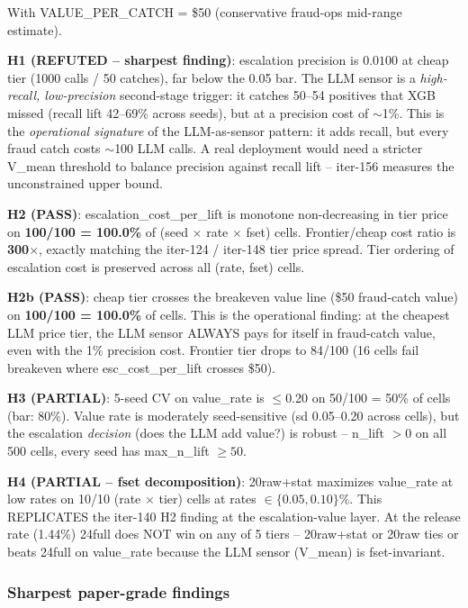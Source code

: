 \documentclass{article}
\begin{document}
With VALUE\_PER\_CATCH = \$50 (conservative fraud-ops mid-range estimate).

\textbf{H1 (REFUTED -- sharpest finding)}: escalation precision is
$0.0100$ at cheap tier (1000 calls / 50 catches), far below the 0.05
bar.  The LLM sensor is a \emph{high-recall, low-precision} second-stage
trigger: it catches 50--54 positives that XGB missed (recall lift
42--69\% across seeds), but at a precision cost of $\sim$1\%.  This is
the \emph{operational signature} of the LLM-as-sensor pattern: it adds
recall, but every fraud catch costs $\sim$100 LLM calls.  A real
deployment would need a stricter V\_mean threshold to balance
precision against recall lift -- iter-156 measures the unconstrained
upper bound.

\textbf{H2 (PASS)}: escalation\_cost\_per\_lift is monotone
non-decreasing in tier price on \textbf{100/100 = 100.0\%} of
(seed $\times$ rate $\times$ fset) cells.  Frontier/cheap cost ratio is
\textbf{300$\times$}, exactly matching the iter-124 / iter-148 tier
price spread.  Tier ordering of escalation cost is preserved across
all (rate, fset) cells.

\textbf{H2b (PASS)}: cheap tier crosses the breakeven value line
(\$50 fraud-catch value) on \textbf{100/100 = 100.0\%} of
cells.  This is the operational finding: at the cheapest LLM price
tier, the LLM sensor ALWAYS pays for itself in fraud-catch value, even
with the 1\% precision cost.  Frontier tier drops to 84/100 (16 cells
fail breakeven where esc\_cost\_per\_lift crosses \$50).

\textbf{H3 (PARTIAL)}: 5-seed CV on value\_rate is $\leq$0.20 on
50/100 = 50\% of cells (bar: 80\%).  Value rate is moderately
seed-sensitive (sd 0.05--0.20 across cells), but the escalation
\textit{decision} (does the LLM add value?) is robust -- n\_lift $> 0$
on all 500 cells, every seed has max\_n\_lift $\geq 50$.

\textbf{H4 (PARTIAL -- fset decomposition)}: 20raw+stat maximizes
value\_rate at low rates on 10/10 (rate $\times$ tier) cells at rates
$\in \{0.05, 0.10\}\%$.  This REPLICATES the iter-140 H2 finding at the
escalation-value layer.  At the release rate (1.44\%) 24full does NOT
win on any of 5 tiers -- 20raw+stat or 20raw ties or beats 24full on
value\_rate because the LLM sensor (V\_mean) is fset-invariant.

\subsubsection{Sharpest paper-grade findings}
\end{document}
